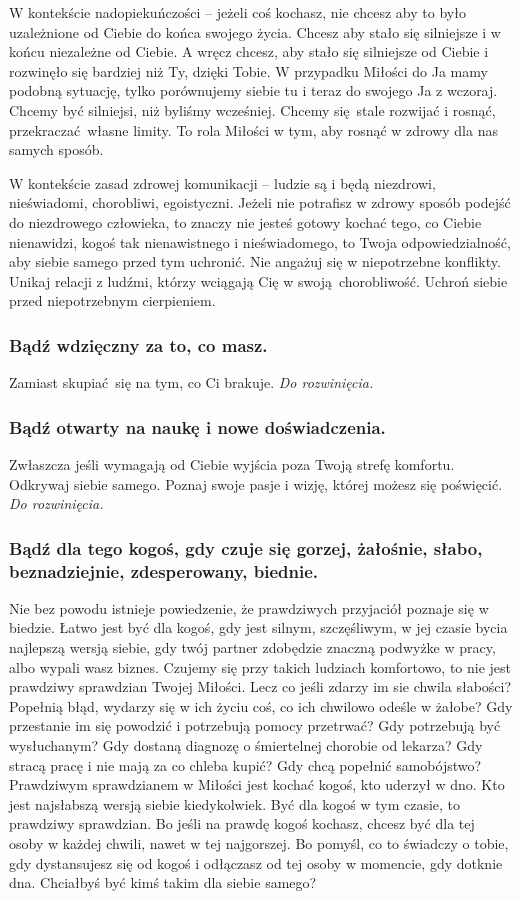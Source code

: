 \documentclass[../dotknieci-miloscia.tex]{subfiles}
\begin{document}
W kontekście nadopiekuńczości -- jeżeli coś kochasz, 
nie chcesz aby to było uzależnione od Ciebie do końca swojego życia.
Chcesz aby stało się silniejsze i w końcu niezależne od Ciebie.
A wręcz chcesz, aby stało się silniejsze od Ciebie i rozwinęło się bardziej niż Ty, dzięki Tobie.
W przypadku Miłości do Ja mamy podobną sytuację, 
tylko porównujemy siebie tu i teraz do swojego Ja z wczoraj.
Chcemy być silniejsi, niż byliśmy wcześniej. 
Chcemy się stale rozwijać i rosnąć, przekraczać własne limity.
To rola Miłości w tym, aby rosnąć w zdrowy dla nas samych sposób.

W kontekście zasad zdrowej komunikacji 
-- ludzie są i będą niezdrowi, nieświadomi, chorobliwi, egoistyczni.
Jeżeli nie potrafisz w zdrowy sposób podejść do niezdrowego człowieka, 
to znaczy nie jesteś gotowy kochać tego, co Ciebie nienawidzi, 
kogoś tak nienawistnego i nieświadomego, 
to Twoja odpowiedzialność, aby siebie samego przed tym uchronić.
Nie angażuj się w niepotrzebne konflikty.
Unikaj relacji z ludźmi, którzy wciągają Cię w swoją chorobliwość.
Uchroń siebie przed niepotrzebnym cierpieniem.

\subsubsection{Bądź wdzięczny za to, co masz.}
Zamiast skupiać się na tym, co Ci brakuje.
\emph{Do rozwinięcia.}

\subsubsection{Bądź otwarty na naukę i nowe doświadczenia.}
Zwłaszcza jeśli wymagają od Ciebie wyjścia poza Twoją strefę komfortu.
Odkrywaj siebie samego. Poznaj swoje pasje i wizję, której możesz się poświęcić.
\emph{Do rozwinięcia.}

\subsubsection{Bądź dla tego kogoś, gdy czuje się gorzej, żałośnie, słabo, beznadziejnie, zdesperowany, biednie.}
Nie bez powodu istnieje powiedzenie, że 
prawdziwych przyjaciół poznaje się w biedzie. 
Łatwo jest być dla kogoś, gdy jest silnym, szczęśliwym, 
w jej czasie bycia najlepszą wersją siebie, 
gdy twój partner zdobędzie znaczną podwyżke w pracy, albo wypali wasz biznes. 
Czujemy się przy takich ludziach komfortowo, 
to nie jest prawdziwy sprawdzian Twojej Miłości. 
Lecz co jeśli zdarzy im sie chwila słabości? 
Popełnią błąd, wydarzy się w ich życiu coś, co ich chwilowo odeśle w żałobe? 
Gdy przestanie im się powodzić i potrzebują pomocy przetrwać? 
Gdy potrzebują być wysłuchanym? 
Gdy dostaną diagnozę o śmiertelnej chorobie od lekarza? 
Gdy stracą pracę i nie mają za co chleba kupić? 
Gdy chcą popełnić samobójstwo? 
Prawdziwym sprawdzianem w Miłości jest kochać kogoś, kto uderzył w dno. 
Kto jest najsłabszą wersją siebie kiedykolwiek. 
Być dla kogoś w tym czasie, to prawdziwy sprawdzian. 
Bo jeśli na prawdę kogoś kochasz, 
chcesz być dla tej osoby w każdej chwili, nawet w tej najgorszej. 
Bo pomyśl, co to świadczy o tobie, 
gdy dystansujesz się od kogoś i odłączasz od tej osoby w momencie, gdy dotknie dna. 
Chciałbyś być kimś takim dla siebie samego? 
\end{document}

